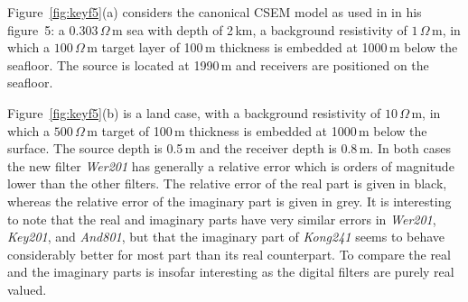 \documentclass[paper,twocolumn,twoside]{geophysics}
\begin{document}
Figure~\ref{fig:keyf5}(a) considers the canonical CSEM model as used in
\cite{GEO.12.Key} in his figure~5: a $0.303\,\Omega\,$m sea with depth of
2\,km, a background resistivity of $1\,\Omega\,$m, in which a $100\,\Omega\,$m
target layer of 100\,m thickness is embedded at 1000\,m below the seafloor.
The source is located at 1990\,m and receivers are positioned on the seafloor.
%
%

Figure~\ref{fig:keyf5}(b) is a land case, with a background resistivity of
$10\,\Omega\,$m, in which a $500\,\Omega\,$m target of 100\,m thickness is
embedded at 1000\,m below the surface. The source depth is 0.5\,m and the
receiver depth is 0.8\,m. In both cases the new filter \emph{Wer201} has
generally a relative error which is orders of magnitude lower than the other
filters. The relative error of the real part is given in black, whereas the
relative error of the imaginary part is given in grey. It is interesting to
note that the real and imaginary parts have very similar errors in
\emph{Wer201}, \emph{Key201}, and \emph{And801}, but that the imaginary part of
\emph{Kong241} seems to behave considerably better for most part than its real
counterpart. To compare the real and the imaginary parts is insofar interesting
as the digital filters are purely real valued.
\end{document}
